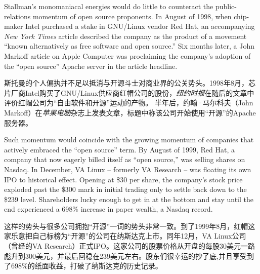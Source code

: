 \ifdefined\eng
Stallman's monomaniacal energies would do little to counteract the public-relations momentum of open source proponents. In August of 1998, when chip-maker Intel purchased a stake in GNU/Linux vendor Red Hat, an accompanying \textit{New York Times} article described the company as the product of a movement ``known alternatively as free software and open source.'' Six months later, a John Markoff article on Apple Computer was proclaiming the company's adoption of the ``open source'' Apache server in the article headline.
\fi

\ifdefined\chs
斯托曼的个人偏执并不足以抵消与开源斗士对商业界的公关势头。1998年8月，芯片厂商Intel购买了GNU/Linux供应商红帽公司的股份，\textit{纽约时报}在随后的文章中评价红帽公司为``自由软件和开源''运动的产物。 半年后，约翰·马尔科夫（John Markoff）在\textit{苹果电脑}杂志上发表文章，标题中称该公司开始使用``开源''的Apache服务器。
\fi

\ifdefined\eng
Such momentum would coincide with the growing momentum of companies that actively embraced the ``open source'' term. By August of 1999, Red Hat, a company that now eagerly billed itself as ``open source,'' was selling shares on Nasdaq. In December, VA Linux -- formerly VA Research -- was floating its own IPO to historical effect. Opening at \$30 per share, the company's stock price exploded past the \$300 mark in initial trading only to settle back down to the \$239 level. Shareholders lucky enough to get in at the bottom and stay until the end experienced a 698\% increase in paper wealth, a Nasdaq record.
\fi

\ifdefined\chs
这样的势头与很多公司拥抱``开源''一词的势头非常一致。到了1999年8月，红帽这家乐意把自己标榜为``开源''的公司在纳斯达克上市。同年12月，VA Linux公司（曾经的VA Research）正式IPO。这家公司的股票价格从开盘的每股30美元一路彪升到300美元，并最后回稳在239美元左右。股东们很幸运的抄了底,并且享受到了698\%的纸面收益，打破了纳斯达克的历史记录。
\fi

